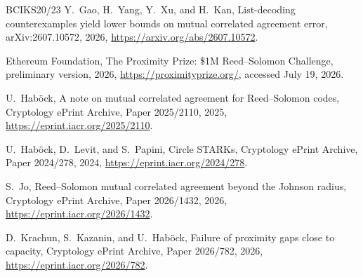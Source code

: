 \documentclass[a4paper,11pt]{amsart}
\theoremstyle{remark}
\begin{document}
\begin{thebibliography}{BCIKS20/23}
Y.~Gao, H.~Yang, Y.~Xu, and H.~Kan,
\newblock List-decoding counterexamples yield lower bounds on mutual
correlated agreement error,
\newblock arXiv:2607.10572, 2026,
\newblock \url{https://arxiv.org/abs/2607.10572}.

{Ethereum Foundation},
\newblock The Proximity Prize: \$1M Reed--Solomon Challenge,
\newblock preliminary version, 2026,
\newblock \url{https://proximityprize.org/}, accessed July 19, 2026.

U.~Hab\"ock,
\newblock A note on mutual correlated agreement for Reed--Solomon codes,
\newblock Cryptology ePrint Archive, Paper 2025/2110, 2025,
\newblock \url{https://eprint.iacr.org/2025/2110}.

U.~Hab\"ock, D.~Levit, and S.~Papini,
\newblock Circle STARKs,
\newblock Cryptology ePrint Archive, Paper 2024/278, 2024,
\newblock \url{https://eprint.iacr.org/2024/278}.

S.~Jo,
\newblock Reed--Solomon mutual correlated agreement beyond the Johnson radius,
\newblock Cryptology ePrint Archive, Paper 2026/1432, 2026,
\newblock \url{https://eprint.iacr.org/2026/1432}.

D.~Krachun, S.~Kazanin, and U.~Hab\"ock,
\newblock Failure of proximity gaps close to capacity,
\newblock Cryptology ePrint Archive, Paper 2026/782, 2026,
\newblock \url{https://eprint.iacr.org/2026/782}.

\end{thebibliography}
\end{document}
